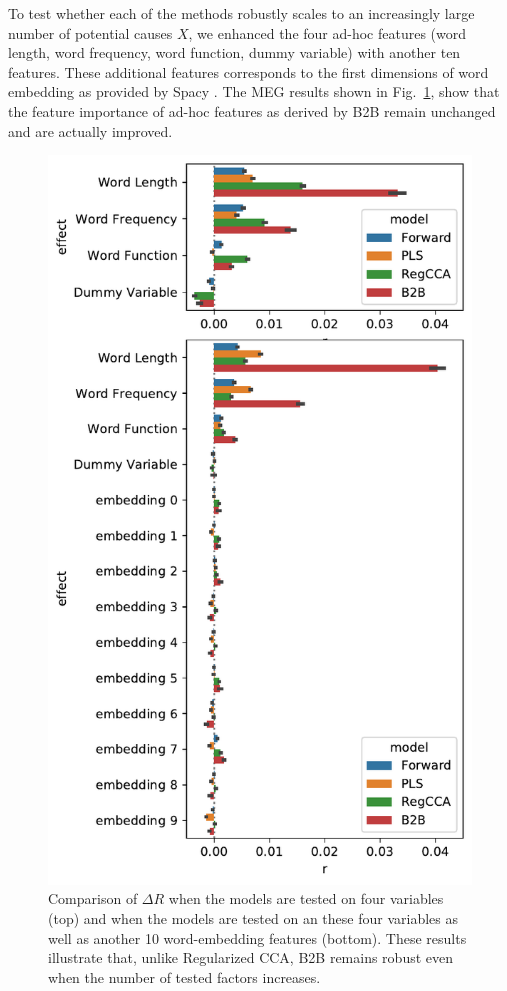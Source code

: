 To test whether each of the methods robustly scales to an increasingly
large number of potential causes $X$, we enhanced the four ad-hoc features
(word length, word frequency, word function, dummy variable) with another
ten features. These additional features corresponds to the first dimensions
of word embedding as provided by Spacy \citep{spacy2}. The MEG results shown
in Fig.~\ref{fig:embeddings}, show that the feature importance of ad-hoc
features as derived by B2B remain unchanged and are actually improved.

\begin{figure}
  \centering
  \includegraphics[width=0.5\linewidth]{figures/compare_embeddings.pdf}
  \caption{Comparison of $\Delta R$ when the models are tested on four
  variables (top) and when the models are tested on an these four variables
  as well as another 10 word-embedding features (bottom). These results
  illustrate that, unlike Regularized CCA, B2B remains robust even when
  the number of tested factors increases.
  \label{fig:embeddings}}
\end{figure}
